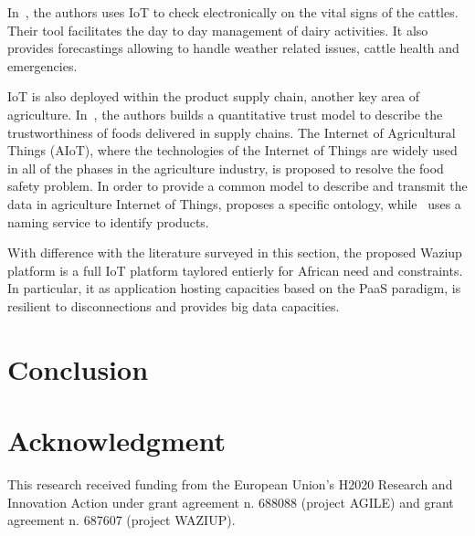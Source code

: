 \documentclass[10pt, conference, compsocconf]{IEEEtran}
\newcommand {\0} {\mathbf 0}
\newcommand {\1} {\mathbf 1}
\begin{document}
In~\cite{Ilapakurti2015}, the authors uses IoT to check electronically on the vital signs of the cattles.
Their tool facilitates the day to day management of dairy activities.
It also provides forecastings allowing to handle weather related issues, cattle health and emergencies.

IoT is also deployed within the product supply chain, another key area of agriculture.
In~\cite{Han2014}, the authors builds a quantitative trust model to describe the trustworthiness of foods delivered in supply chains.
The Internet of Agricultural Things (AIoT), where the technologies of the Internet of Things are widely used in all of the phases in the agriculture industry, is proposed to resolve the food safety problem.
In order to provide a common model to describe and transmit the data in agriculture Internet of Things, \cite{Hu2011} proposes a specific ontology, while~\cite{Liu2014} uses a naming service to identify products.


With difference with the literature surveyed in this section, the proposed Waziup platform is a full IoT platform taylored entierly for African need and constraints.
In particular, it as application hosting capacities based on the PaaS paradigm, is resilient to disconnections and provides big data capacities.


\section{Conclusion}
\label{conclu}


\section*{Acknowledgment}
This research received funding from the European Union's H2020 Research and Innovation Action under grant agreement n. 688088 (project AGILE) and grant agreement n. 687607 (project WAZIUP).



\end{document}

